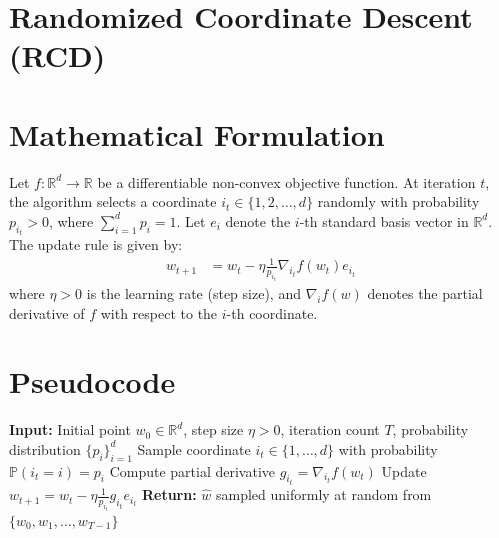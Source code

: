 \documentclass{article}
\begin{document}
\section*{Randomized Coordinate Descent (RCD)}
\section*{Mathematical Formulation}
Let $f: \mathbb{R}^d \to \mathbb{R}$ be a differentiable non-convex objective function. At iteration $t$, the algorithm selects a coordinate $i_t \in \{1, 2, \dots, d\}$ randomly with probability $p_{i_t} > 0$, where $\sum_{i=1}^d p_i = 1$. Let $e_i$ denote the $i$-th standard basis vector in $\mathbb{R}^d$. The update rule is given by:
\begin{align*}
w_{t+1} &= w_t - \eta \frac{1}{p_{i_t}} \nabla_{i_t} f(w_t) e_{i_t}
\end{align*}
where $\eta > 0$ is the learning rate (step size), and $\nabla_{i} f(w)$ denotes the partial derivative of $f$ with respect to the $i$-th coordinate.

\section*{Pseudocode}
\begin{algorithm}[H]
\caption{Randomized Coordinate Descent for Non-Convex Optimization}
\begin{algorithmic}[1]
\State \textbf{Input:} Initial point $w_0 \in \mathbb{R}^d$, step size $\eta > 0$, iteration count $T$, probability distribution $\{p_i\}_{i=1}^d$
\State Sample coordinate $i_t \in \{1, \dots, d\}$ with probability $\mathbb{P}(i_t = i) = p_i$
\State Compute partial derivative $g_{i_t} = \nabla_{i_t} f(w_t)$
\State Update $w_{t+1} = w_t - \eta \frac{1}{p_{i_t}} g_{i_t} e_{i_t}$
\EndFor
\State \textbf{Return:} $\hat{w}$ sampled uniformly at random from $\{w_0, w_1, \dots, w_{T-1}\}$
\end{algorithmic}
\end{algorithm}
\end{document}
